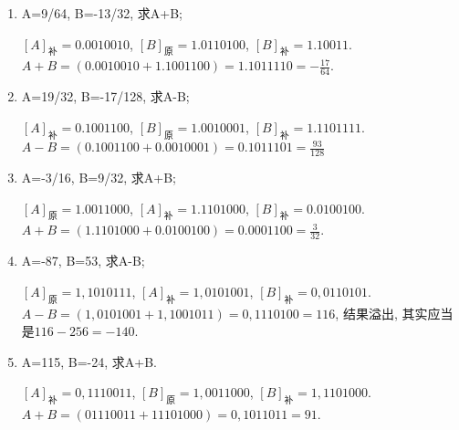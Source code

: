 \documentclass[UTF8]{report}
\newcommand{\cdclass}[2]{[#1]_{\text{#2}}}
\newenvironment{solution}{{\noindent\hskip 2em \bf 解 \quad}}{}
\begin{document}
\begin{solution}
    \begin{enumerate}
        \item A=9/64, B=-13/32, 求A+B; 
        
        $\cdclass{A}{补} = 0.001 0010$, $\cdclass{B}{原} = 1.011 0100$, $\cdclass{B}{补} = 1.10011$. $A+B = (0.001 0010 + 1.100 1100) = 1.101 1110 = -\frac{17}{64}$.

        \item A=19/32, B=-17/128, 求A-B; 
        
        $\cdclass{A}{补} = 0.100 1100$, $\cdclass{B}{原} = 1.001 0001$, $\cdclass{B}{补} = 1.110 1111$. $A-B = (0.100 1100 + 0.001 0001) = 0.101 1101 = \frac{93}{128}$

        \item A=-3/16, B=9/32, 求A+B; 
        
        $\cdclass{A}{原} = 1.001 1000$, $\cdclass{A}{补} = 1.110 1000$, $\cdclass{B}{补} = 0.010 0100$. $A+B = (1.1101000 + 0.0100100) = 0.000 1100 = \frac{3}{32}$.

        \item A=-87, B=53, 求A-B; 
        
        $\cdclass{A}{原} = 1,101 0111$, $\cdclass{A}{补} = 1,0101001$, $\cdclass{B}{补} = 0,011 0101$. $A-B = (1,010 1001 + 1,100 1011) = 0,111 0100 = 116$, 结果溢出, 其实应当是$116-256=-140$.

        \item A=115, B=-24, 求A+B.
        
        $\cdclass{A}{补} = 0,111 0011$, $\cdclass{B}{原} = 1,001 1000$, $\cdclass{B}{补} = 1,110 1000$. $A+B = (01110011 + 11101000) = 0,101 1011 = 91$.

    \end{enumerate}
\end{solution}
    
\end{document}
